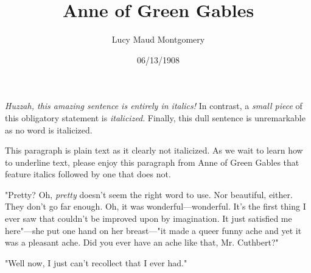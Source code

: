 \documentclass[a4paper]{article}
\title{Anne of Green Gables}
\author{Lucy Maud Montgomery}
\date{06/13/1908}
\begin{document}
\maketitle

\textit{Huzzah, this amazing sentence is entirely in italics!} In contrast, a \textit{small piece} of this obligatory statement is \textit{italicized}. Finally, this dull sentence is unremarkable as no word is italicized.

This paragraph is plain text as it clearly not italicized. As we wait to learn how to underline text, please enjoy this paragraph from Anne of Green Gables that feature italics followed by one that does not.

"Pretty? Oh, \textit{pretty} doesn't seem the right word to use. Nor beautiful, either. They don't go far enough. Oh, it was wonderful---wonderful. It's the first thing I ever saw that couldn't be improved upon by imagination. It just satisfied me here"---she put one hand on her breast---"it made a queer funny ache and yet it was a pleasant ache. Did you ever have an ache like that, Mr. Cuthbert?"

"Well now, I just can't recollect that I ever had."
\end{document}
